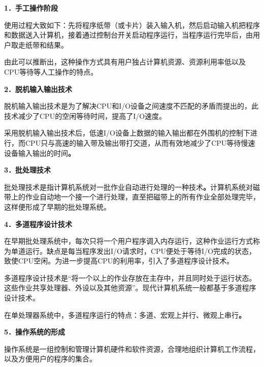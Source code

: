 \textbf{{1．手工操作阶段}}

使用过程大致如下：先将程序纸带（或卡片）装入输入机，然后启动输入机把程序和数据送入计算机，接着通过控制台开关启动程序运行，当程序运行完毕后，由用户取走纸带和结果。

由此可以推断出，这种操作方式具有{用户独占计算机资源、资源利用率低以及CPU等待等人工操作}的特点。

\textbf{{2．脱机输入输出技术}}

脱机输入输出技术是{为了解决CPU和I/O设备之间速度不匹配的矛盾}而提出的，此技术减少了CPU的空闲等待时间，提高了I/O速度。

采用脱机输入输出技术后，低速I/O设备上数据的输入输出都在外围机的控制下进行，而CPU只与高速的输入带及输出带打交道，从而{有效地减少了CPU等待慢速设备输入输出的时间}\textbf{。}

\textbf{{3．批处理技术}}

{批处理技术是指计算机系统对一批作业自动进行处理的一种技术}\textbf{{。}}计算机系统对磁带上的作业自动地一个接一个进行处理，直至把磁带上的所有作业全部处理完毕，这样便形成了早期的批处理系统。

\textbf{{4．多道程序设计技术}}

在早期批处理系统中，每次只将一个用户程序调入内存运行，这种作业运行方式称为单道运行。缺点是{每当程序发出I/O请求时，CPU便处于等待I/O完成的状态，致使CPU空闲。}{为进一步提高CPU的利用率，引入了多道程序设计技术。}

{多道程序设计技术是``将一个以上的作业存放在主存中，并且同时处于运行状态。这些作业共享处理器、外设以及其他资源''。现代计算机系统一般都基于多道程序设计技术。}

在单处理器系统中，多道程序运行的特点：{多道、}{宏观上并行、}{微观上串行}\textbf{。}

\textbf{{5．操作系统的形成}}

{操作系统}是一组{控制和管理}{计算机硬件和软件资源}，{合理地组织}计算机工作流程，以及{方便用户}的程序的集合。
